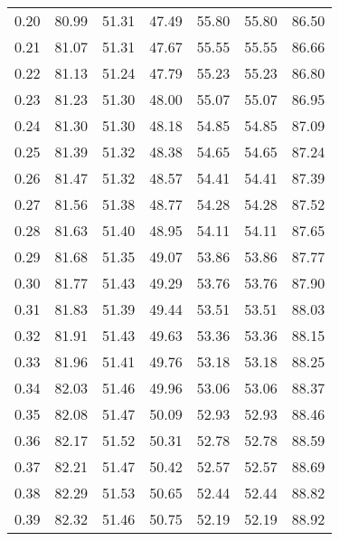 \begin{tabular}{|c|c|c|c|c|c|c|}
      0.20 &     80.99 &     51.31 &      47.49 &   55.80 &      55.80 &         86.50 \\
      0.21 &     81.07 &     51.31 &      47.67 &   55.55 &      55.55 &         86.66 \\
      0.22 &     81.13 &     51.24 &      47.79 &   55.23 &      55.23 &         86.80 \\
      0.23 &     81.23 &     51.30 &      48.00 &   55.07 &      55.07 &         86.95 \\
      0.24 &     81.30 &     51.30 &      48.18 &   54.85 &      54.85 &         87.09 \\
      0.25 &     81.39 &     51.32 &      48.38 &   54.65 &      54.65 &         87.24 \\
      0.26 &     81.47 &     51.32 &      48.57 &   54.41 &      54.41 &         87.39 \\
      0.27 &     81.56 &     51.38 &      48.77 &   54.28 &      54.28 &         87.52 \\
      0.28 &     81.63 &     51.40 &      48.95 &   54.11 &      54.11 &         87.65 \\
      0.29 &     81.68 &     51.35 &      49.07 &   53.86 &      53.86 &         87.77 \\
      0.30 &     81.77 &     51.43 &      49.29 &   53.76 &      53.76 &         87.90 \\
      0.31 &     81.83 &     51.39 &      49.44 &   53.51 &      53.51 &         88.03 \\
      0.32 &     81.91 &     51.43 &      49.63 &   53.36 &      53.36 &         88.15 \\
      0.33 &     81.96 &     51.41 &      49.76 &   53.18 &      53.18 &         88.25 \\
      0.34 &     82.03 &     51.46 &      49.96 &   53.06 &      53.06 &         88.37 \\
      0.35 &     82.08 &     51.47 &      50.09 &   52.93 &      52.93 &         88.46 \\
      0.36 &     82.17 &     51.52 &      50.31 &   52.78 &      52.78 &         88.59 \\
      0.37 &     82.21 &     51.47 &      50.42 &   52.57 &      52.57 &         88.69 \\
      0.38 &     82.29 &     51.53 &      50.65 &   52.44 &      52.44 &         88.82 \\
      0.39 &     82.32 &     51.46 &      50.75 &   52.19 &      52.19 &         88.92 \\

\end{tabular}
